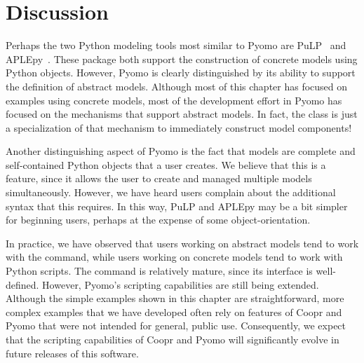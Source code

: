 \section{Discussion}

Perhaps the two Python modeling tools most similar to Pyomo are
PuLP~\cite{PuLP} and APLEpy~\cite{APLEpy}.  These package both support
the construction of concrete models using Python objects.  However,
Pyomo is clearly distinguished by its ability to support the definition
of abstract models.  Although most of this chapter has focused on
examples using concrete models, most of the development effort in Pyomo
has focused on the mechanisms that support abstract models.  In fact,
the  class is just a specialization of that mechanism
to immediately construct model components!

Another distinguishing aspect of Pyomo is the fact that models are complete
and self-contained Python objects that a user creates.  We believe that this 
is a feature, since it allows the user to create and managed multiple models 
simultaneously. However, we have heard users complain about the additional 
syntax that this requires. In this way, PuLP and APLEpy may be a bit simpler 
for beginning users, perhaps at the expense of some object-orientation.

In practice, we have observed that users working on abstract models
tend to work with the  command, while users working on
concrete models tend to work with Python scripts.  The 
command is relatively mature, since its interface is well-defined.
However, Pyomo's scripting capabilities are still being extended.
Although the simple examples shown in this chapter are straightforward,
more complex examples that we have developed often rely on features of
Coopr and Pyomo that were not intended for general, public use.  
Consequently, we expect that the scripting capabilities of Coopr and 
Pyomo will significantly evolve in future releases of this software.



